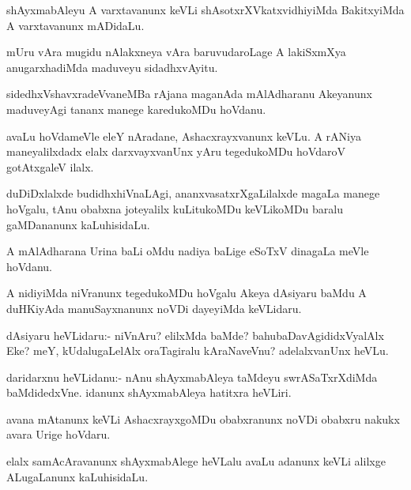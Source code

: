 \begin{mng}
shAyxmabAleyu A varxtavanunx keVLi shAsotxrXVkatxvidhiyiMda BakitxyiMda A varxtavanunx mADidaLu.
\end{mng}

\begin{mng}
mUru vAra mugidu nAlakxneya vAra baruvudaroLage A lakiSxmXya anugarxhadiMda maduveyu sidadhxvAyitu. 
\end{mng}

\begin{mng}
sidedhxVshavxradeVvaneMBa rAjana maganAda mAlAdharanu Akeyanunx maduveyAgi tananx manege karedukoMDu hoVdanu.
\end{mng}

\begin{mng}
avaLu hoVdameVle eleY nAradane, Ashacxrayxvanunx keVLu. A rANiya maneyalilxdadx elalx darxvayxvanUnx yAru tegedukoMDu hoVdaroV gotAtxgaleV ilalx.
\end{mng}

\begin{mng}
duDiDxlalxde budidhxhiVnaLAgi, ananxvasatxrXgaLilalxde magaLa manege hoVgalu, tAnu obabxna joteyalilx kuLitukoMDu keVLikoMDu baralu gaMDananunx kaLuhisidaLu.
\end{mng}

\begin{mng}
A mAlAdharana Urina baLi oMdu nadiya baLige eSoTxV dinagaLa meVle hoVdanu.
\end{mng}

\begin{mng}
A nidiyiMda niVranunx tegedukoMDu hoVgalu Akeya dAsiyaru baMdu A duHKiyAda manuSayxnanunx noVDi dayeyiMda keVLidaru.
\end{mng}

\begin{mng}
dAsiyaru heVLidaru:- niVnAru? elilxMda baMde? bahubaDavAgididxVyalAlx Eke? meY, kUdalugaLelAlx oraTagiralu kAraNaveVnu? adelalxvanUnx heVLu.
\end{mng}

\begin{mng}
daridarxnu heVLidanu:- nAnu shAyxmabAleya taMdeyu swrASaTxrXdiMda baMdidedxVne. idanunx shAyxmabAleya hatitxra heVLiri.
\end{mng}

\begin{mng}
avana mAtanunx keVLi AshacxrayxgoMDu obabxranunx noVDi obabxru nakukx avara Urige hoVdaru.
\end{mng}

\begin{mng}
elalx samAcAravanunx shAyxmabAlege heVLalu avaLu adanunx keVLi alilxge ALugaLanunx kaLuhisidaLu.
\end{mng}

